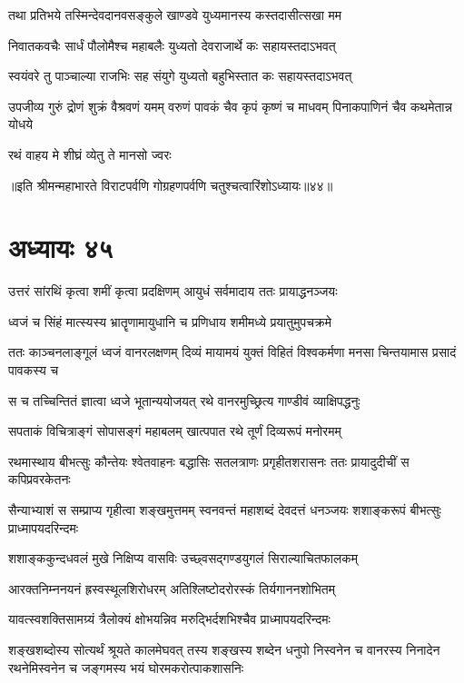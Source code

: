 \twolineshloka
{तथा प्रतिभये तस्मिन्देवदानवसङ्कुले}
{खाण्डवे युध्यमानस्य कस्तदासीत्सखा मम}


\twolineshloka
{निवातकवचैः सार्धं पौलोमैश्च महाबलैः}
{युध्यतो देवराजार्थे कः सहायस्तदाऽभवत्}


\twolineshloka
{स्वयंवरे तु पाञ्चाल्या राजभिः सह संयुगे}
{युध्यतो बहुभिस्तात कः सहायस्तदाऽभवत्}


\threelineshloka
{उपजीव्य गुरुं द्रोणं शुक्रं वैश्रवणं यमम्}
{वरुणं पावकं चैव कृपं कृष्णं च माधवम्}
{पिनाकपाणिनं चैव कथमेतान्न योधये}


\onelineshloka
{रथं वाहय मे शीघ्रं व्येतु ते मानसो ज्वरः}


॥इति श्रीमन्महाभारते विराटपर्वणि गोग्रहणपर्वणि चतुश्चत्वारिंशोऽध्यायः॥४४॥

\chapter{अध्यायः ४५}

\twolineshloka
{उत्तरं सांरथिं कृत्वा शमीं कृत्वा प्रदक्षिणम्}
{आयुधं सर्वमादाय ततः प्रायाद्धनञ्जयः}


\twolineshloka
{ध्वजं च सिंहं मात्स्यस्य भ्रातॄणामायुधानि च}
{प्रणिधाय शमीमध्ये प्रयातुमुपचक्रमे}


\threelineshloka
{ततः काञ्चनलाङ्गूलं ध्वजं वानरलक्षणम्}
{दिव्यं मायामयं युक्तं विहितं विश्वकर्मणा}
{मनसा चिन्तयामास प्रसादं पावकस्य च}


\twolineshloka
{स च तच्चिन्तितं ज्ञात्वा ध्वजे भूतान्ययोजयत्}
{रथे वानरमुच्छ्रित्य गाण्डीवं व्याक्षिपद्धनुः}


\twolineshloka
{सपताकं विचित्राङ्गं सोपासङ्गं महाबलम्}
{खात्पपात रथे तूर्णं दिव्यरूपं मनोरमम्}


\threelineshloka
{रथमास्थाय बीभत्सुः कौन्तेयः श्वेतवाहनः}
{बद्धासिः सतलत्राणः प्रगृहीतशरासनः}
{ततः प्रायादुदीचीं स कपिप्रवरकेतनः}


\threelineshloka
{सैन्याभ्याशं स सम्प्राप्य गृहीत्वा शङ्खमुत्तमम्}
{स्वनवन्तं महाशब्दं देवदत्तं धनञ्जयः}
{शशाङ्करूपं बीभत्सुः प्राध्मापयदरिन्दमः}


\twolineshloka
{शशाङ्ककुन्दधवलं मुखे निक्षिप्य वासविः}
{उच्छ्वसद्गण्डयुगलं सिराल्याचितफालकम्}


\twolineshloka
{आरक्तनिम्ननयनं ह्रस्वस्थूलशिरोधरम्}
{अतिश्लिष्टोदरोरस्कं तिर्यगाननशोभितम्}


\twolineshloka
{यावत्स्वशक्तिसामग्र्यं त्रैलोक्यं क्षोभयन्निव}
{मरुद्भिर्दशभिश्चैव प्राध्मापयदरिन्दमः}


\onelineshloka
{शङ्खशब्दोस्य सोत्यर्थं श्रूयते कालमेघवत्}
\threelineshloka
{तस्य शङ्खस्य शब्देन धनुपो निस्वनेन च}
{वानरस्य निनादेन रथनेमिस्वनेन च}
{जङ्गमस्य भयं घोरमकरोत्पाकशासनिः}


